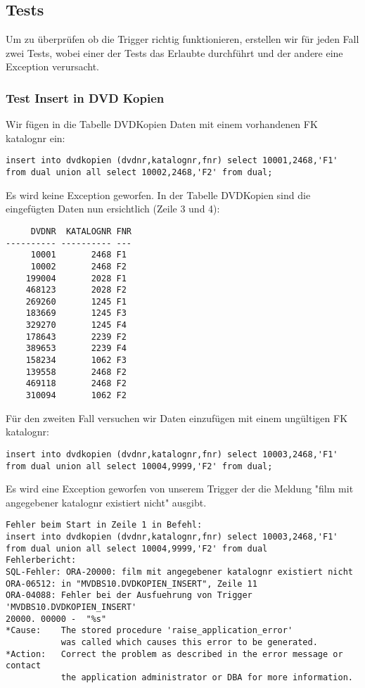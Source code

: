 \documentclass[11pt,a4paper,parskip=half]{scrartcl}
\begin{document}
\subsection{Tests}
Um zu überprüfen ob die Trigger richtig funktionieren, erstellen wir für jeden Fall zwei Tests, wobei einer der Tests das Erlaubte durchführt und der andere eine Exception verursacht.

\subsubsection{Test Insert in DVD Kopien}
Wir fügen in die Tabelle DVDKopien Daten mit einem vorhandenen FK katalognr ein:

\begin{lstlisting}
insert into dvdkopien (dvdnr,katalognr,fnr) select 10001,2468,'F1'
from dual union all select 10002,2468,'F2' from dual;
\end{lstlisting}

Es wird keine Exception geworfen. In der Tabelle DVDKopien sind die eingefügten Daten nun ersichtlich (Zeile 3 und 4):

\begin{lstlisting}
     DVDNR  KATALOGNR FNR
---------- ---------- ---
     10001       2468 F1  
     10002       2468 F2  
    199004       2028 F1  
    468123       2028 F2  
    269260       1245 F1  
    183669       1245 F3  
    329270       1245 F4  
    178643       2239 F2  
    389653       2239 F4  
    158234       1062 F3  
    139558       2468 F2  
    469118       2468 F2  
    310094       1062 F2  
\end{lstlisting}

Für den zweiten Fall versuchen wir Daten einzufügen mit einem ungültigen FK katalognr:

\begin{lstlisting}
insert into dvdkopien (dvdnr,katalognr,fnr) select 10003,2468,'F1'
from dual union all select 10004,9999,'F2' from dual;
\end{lstlisting}

Es wird eine Exception geworfen von unserem Trigger der die Meldung "film mit angegebener katalognr existiert nicht" ausgibt.

\begin{lstlisting}
Fehler beim Start in Zeile 1 in Befehl:
insert into dvdkopien (dvdnr,katalognr,fnr) select 10003,2468,'F1'
from dual union all select 10004,9999,'F2' from dual
Fehlerbericht:
SQL-Fehler: ORA-20000: film mit angegebener katalognr existiert nicht
ORA-06512: in "MVDBS10.DVDKOPIEN_INSERT", Zeile 11
ORA-04088: Fehler bei der Ausfuehrung von Trigger 'MVDBS10.DVDKOPIEN_INSERT'
20000. 00000 -  "%s"
*Cause:    The stored procedure 'raise_application_error'
           was called which causes this error to be generated.
*Action:   Correct the problem as described in the error message or contact
           the application administrator or DBA for more information.
\end{lstlisting}
\end{document}
